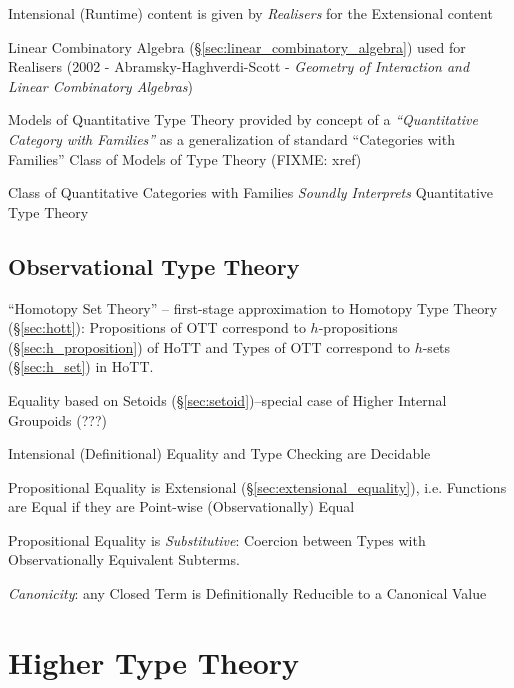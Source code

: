 Intensional (Runtime) content is given by \emph{Realisers} for the Extensional
content

Linear Combinatory Algebra (\S\ref{sec:linear_combinatory_algebra}) used for
Realisers (2002 - Abramsky-Haghverdi-Scott - \emph{Geometry of Interaction and
  Linear Combinatory Algebras})

Models of Quantitative Type Theory provided by concept of a
\emph{``Quantitative Category with Families''} as a generalization of standard
``Categories with Families'' Class of Models of Type Theory (FIXME: xref)

Class of Quantitative Categories with Families \emph{Soundly Interprets}
Quantitative Type Theory


\subsection{Observational Type Theory}\label{sec:observational_type}

``Homotopy Set Theory'' -- first-stage approximation to Homotopy Type
Theory (\S\ref{sec:hott}): Propositions of OTT correspond to
$h$-propositions (\S\ref{sec:h_proposition}) of HoTT and Types of OTT
correspond to $h$-sets (\S\ref{sec:h_set}) in HoTT.

Equality based on Setoids (\S\ref{sec:setoid})--special case of Higher
Internal Groupoids (???)

Intensional (Definitional) Equality and Type Checking are Decidable

Propositional Equality is Extensional
(\S\ref{sec:extensional_equality}), i.e. Functions are Equal if they
are Point-wise (Observationally) Equal

Propositional Equality is \emph{Substitutive}: Coercion between Types
with Observationally Equivalent Subterms.

\emph{Canonicity}: any Closed Term is Definitionally Reducible to a
Canonical Value



\section{Higher Type Theory}\label{sec:higher_type_theory}

